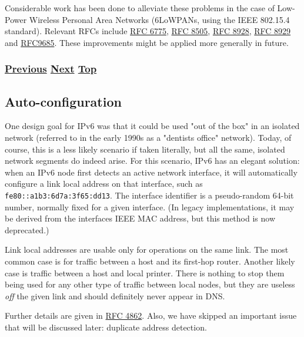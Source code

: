 \documentclass[
]{article}
\begin{document}
Considerable work has been done to alleviate these problems in the case
of Low-Power Wireless Personal Area Networks (6LoWPANs, using the IEEE
802.15.4 standard). Relevant RFCs include
\href{https://www.rfc-editor.org/info/rfc6775}{RFC 6775},
\href{https://www.rfc-editor.org/info/rfc8505}{RFC 8505},
\href{https://www.rfc-editor.org/info/rfc8928}{RFC 8928},
\href{https://www.rfc-editor.org/info/rfc8929}{RFC 8929} and
\href{https://www.rfc-editor.org/info/rfc9685}{RFC9685}. These
improvements might be applied more generally in future.

\subsubsection{\texorpdfstring{\hyperref[layer-2-functions]{Previous}
\hyperref[auto-configuration]{Next}
\hyperref[ipv6-basic-technology]{Top}}{Previous Next Top}}\label{previous-next-top-10}

\pagebreak

\subsection{Auto-configuration}\label{auto-configuration}

One design goal for IPv6 was that it could be used "out of the box" in
an isolated network (referred to in the early 1990s as a
"dentist\textquotesingle s office" network). Today, of course, this is a
less likely scenario if taken literally, but all the same, isolated
network segments do indeed arise. For this scenario, IPv6 has an elegant
solution: when an IPv6 node first detects an active network interface,
it will automatically configure a link local address on that interface,
such as \texttt{fe80::a1b3:6d7a:3f65:dd13}. The interface identifier is
a pseudo-random 64-bit number, normally fixed for a given interface. (In
legacy implementations, it may be derived from the
interface\textquotesingle s IEEE MAC address, but this method is now
deprecated.)

Link local addresses are usable only for operations on the same link.
The most common case is for traffic between a host and its first-hop
router. Another likely case is traffic between a host and local printer.
There is nothing to stop them being used for any other type of traffic
between local nodes, but they are useless \emph{off} the given link and
should definitely never appear in DNS.

Further details are given in
\href{https://www.rfc-editor.org/info/rfc4862}{RFC 4862}. Also, we have
skipped an important issue that will be discussed later: duplicate
address detection.
\end{document}
